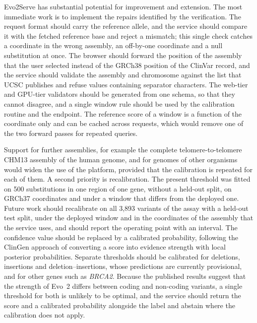 \newpage
{}
Evo2Serve has substantial potential for improvement and extension. The most immediate work is to implement the repairs identified by the verification. The request format should carry the reference allele, and the service should compare it with the fetched reference base and reject a mismatch; this single check catches a coordinate in the wrong assembly, an off-by-one coordinate and a null substitution at once. The browser should forward the position of the assembly that the user selected instead of the GRCh38 position of the ClinVar record, and the service should validate the assembly and chromosome against the list that UCSC publishes and refuse values containing separator characters. The web-tier and GPU-tier validators should be generated from one schema, so that they cannot disagree, and a single window rule should be used by the calibration routine and the endpoint. The reference score of a window is a function of the coordinate only and can be cached across requests, which would remove one of the two forward passes for repeated queries.

Support for further assemblies, for example the complete telomere-to-telomere CHM13 assembly of the human genome, and for genomes of other organisms would widen the use of the platform, provided that the calibration is repeated for each of them. A second priority is recalibration. The present threshold was fitted on 500 substitutions in one region of one gene, without a held-out split, on GRCh37 coordinates and under a window that differs from the deployed one. Future work should recalibrate on all 3,893 variants of the assay with a held-out test split, under the deployed window and in the coordinates of the assembly that the service uses, and should report the operating point with an interval. The confidence value should be replaced by a calibrated probability, following the ClinGen approach of converting a score into evidence strength with local posterior probabilities. Separate thresholds should be calibrated for deletions, insertions and deletion--insertions, whose predictions are currently provisional, and for other genes such as \textit{BRCA2}. Because the published results suggest that the strength of Evo~2 differs between coding and non-coding variants, a single threshold for both is unlikely to be optimal, and the service should return the score and a calibrated probability alongside the label and abstain where the calibration does not apply.


